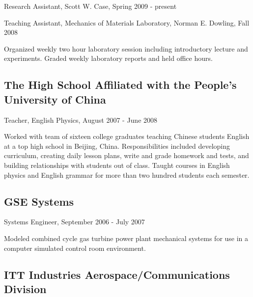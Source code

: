 \documentclass[10pt,letterpaper]{article}
\renewenvironment{itemize}{
  \begin{list}{}{
    \setlength{\leftmargin}{1.5em}
    \setlength{\itemsep}{0.25em}
    \setlength{\parskip}{0pt}
    \setlength{\parsep}{0.25em}
  }
}{
  \end{list}
}
\begin{document}
\begin{itemize}
\item Research Assistant, Scott W. Case, Spring 2009 - present
\item Teaching Assistant, Mechanics of Materials Laboratory, Norman E. Dowling, Fall 2008
    \begin{itemize}
    \item Organized weekly two hour laboratory session including introductory lecture and experiments.  Graded weekly laboratory reports and held office hours.
    \end{itemize}
\end{itemize}

\subsection*{The High School Affiliated with the People's University of China}

\begin{itemize}
\item Teacher, English Physics, August 2007 - June 2008
    \begin{itemize}
    \item Worked with team of sixteen college graduates teaching Chinese students English at a top high school in Beijing, China.  Responsibilities included developing curriculum, creating daily lesson plans, write and grade homework and tests, and building relationships with students out of class.  Taught courses in English physics and English grammar for more than two hundred students each semester.
    \end{itemize}
\end{itemize}

\subsection*{GSE Systems}

\begin{itemize}
\item Systems Engineer, September 2006 - July 2007
    \begin{itemize}
    \item Modeled combined cycle gas turbine power plant mechanical systems for use in a computer simulated control room environment.
    \end{itemize}
\end{itemize}

\subsection*{ITT Industries Aerospace/Communications Division}
\end{document}
